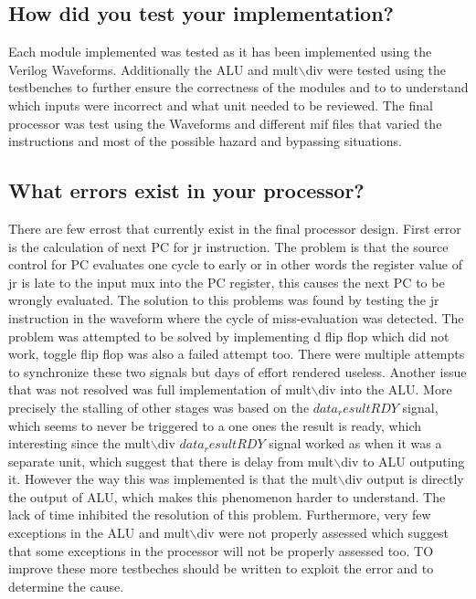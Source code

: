 \documentclass{article}
\begin{document}
\subsection{How did you test your implementation?}
Each module implemented was tested as it has been implemented using the Verilog Waveforms. Additionally the ALU and mult$\backslash$div were tested using the testbenches to further ensure the correctness of the modules and to to understand which inputs were incorrect and what unit needed to be reviewed. The final processor was test using the Waveforms and different mif files that varied the instructions and most of the possible hazard and bypassing situations.
\subsection{What errors exist in your processor?}
There are few errost that currently exist in the final processor design.
First error is the calculation of next PC for jr instruction. The problem is that the source control for PC evaluates one cycle to early or in other words the register value of jr is late to the input mux into the PC register, this causes the next PC to be wrongly evaluated. The solution to this problems was found by testing the jr instruction in the waveform where the cycle of miss-evaluation was detected. The problem was attempted to be solved by implementing d flip flop which did not work, toggle flip flop was also a failed attempt too. There were multiple attempts to synchronize these two signals but days of effort rendered useless.
Another issue that was not resolved was full implementation of mult$\backslash$div into the ALU. More precisely the stalling of other stages was based on the $data_resultRDY$ signal, which seems to never be triggered to a one ones the result is ready, which interesting since the mult$\backslash$div  $data_resultRDY$ signal worked as when it was a separate unit, which suggest that there is delay from mult$\backslash$div to ALU outputing it. However the way this was implemented is that the mult$\backslash$div output is directly the output of ALU, which makes this phenomenon harder to understand. The lack of time inhibited the resolution of this problem.
Furthermore, very few exceptions in the ALU and mult$\backslash$div were not properly assessed which suggest that some exceptions in the processor will not be properly assessed  too. TO improve these more testbeches should be written to exploit the error and to determine the cause.
\end{document}
